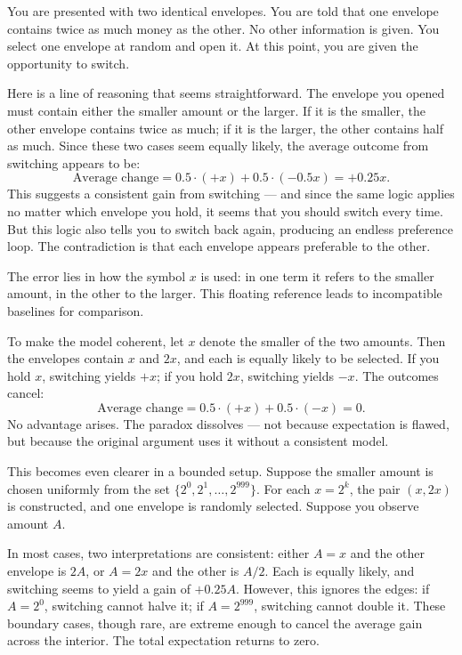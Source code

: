 You are presented with two identical envelopes. You are told that one envelope contains twice as much money as the other. No other information is given. You select one envelope at random and open it. At this point, you are given the opportunity to switch.

Here is a line of reasoning that seems straightforward. The envelope you opened must contain either the smaller amount or the larger. If it is the smaller, the other envelope contains twice as much; if it is the larger, the other contains half as much. Since these two cases seem equally likely, the average outcome from switching appears to be:
\[
\text{Average change} = 0.5 \cdot (+x) + 0.5 \cdot (-0.5x) = +0.25x.
\]
This suggests a consistent gain from switching — and since the same logic applies no matter which envelope you hold, it seems that you should switch every time. But this logic also tells you to switch back again, producing an endless preference loop. The contradiction is that each envelope appears preferable to the other.

The error lies in how the symbol \( x \) is used: in one term it refers to the smaller amount, in the other to the larger. This floating reference leads to incompatible baselines for comparison.

To make the model coherent, let \( x \) denote the smaller of the two amounts. Then the envelopes contain \( x \) and \( 2x \), and each is equally likely to be selected. If you hold \( x \), switching yields \( +x \); if you hold \( 2x \), switching yields \( -x \). The outcomes cancel:
\[
\text{Average change} = 0.5 \cdot (+x) + 0.5 \cdot (-x) = 0.
\]
No advantage arises. The paradox dissolves — not because expectation is flawed, but because the original argument uses it without a consistent model.

This becomes even clearer in a bounded setup. Suppose the smaller amount is chosen uniformly from the set \( \{2^0, 2^1, \dots, 2^{999}\} \). For each \( x = 2^k \), the pair \( (x, 2x) \) is constructed, and one envelope is randomly selected. Suppose you observe amount \( A \).

In most cases, two interpretations are consistent: either \( A = x \) and the other envelope is \( 2A \), or \( A = 2x \) and the other is \( A/2 \). Each is equally likely, and switching seems to yield a gain of \( +0.25A \). However, this ignores the edges: if \( A = 2^0 \), switching cannot halve it; if \( A = 2^{999} \), switching cannot double it. These boundary cases, though rare, are extreme enough to cancel the average gain across the interior. The total expectation returns to zero. 

